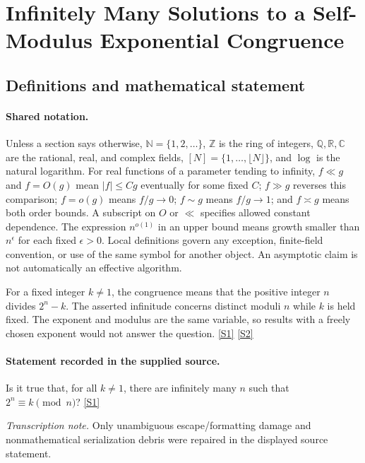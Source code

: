 \documentclass[11pt,a4paper]{article}
\newcommand{\N}{\mathbb{N}}
\newcommand{\Z}{\mathbb{Z}}
\newcommand{\Q}{\mathbb{Q}}
\newcommand{\R}{\mathbb{R}}
\newcommand{\C}{\mathbb{C}}
\newcommand{\sref}[2]{\hyperlink{source:#1:#2}{[S#2]}}
\begin{document}
\section{Infinitely Many Solutions to a Self-Modulus Exponential Congruence}\label{statement}


\subsection{Definitions and mathematical statement}

\paragraph{Shared notation.}Unless a section says otherwise, $\N=\{1,2,\ldots\}$,
$\Z$ is the ring of integers, $\Q,\R,\C$ are the rational, real, and complex
fields, $[N]=\{1,\ldots,\lfloor N\rfloor\}$, and $\log$ is the natural
logarithm. For real functions of a parameter tending to infinity,
$f\ll g$ and $f=O(g)$ mean $|f|\leq Cg$ eventually for some fixed $C$;
$f\gg g$ reverses this comparison; $f=o(g)$ means $f/g\to0$;
$f\sim g$ means $f/g\to1$; and $f\asymp g$ means both order bounds.
A subscript on $O$ or $\ll$ specifies allowed constant dependence.
The expression $n^{o(1)}$ in an upper bound means growth smaller than
$n^\epsilon$ for each fixed $\epsilon>0$. Local definitions govern any
exception, finite-field convention, or use of the same symbol for another
object. An asymptotic claim is not automatically an effective algorithm.



For a fixed integer $k\ne1$, the congruence means that the positive integer $n$ divides $2^n-k$. The asserted infinitude concerns distinct moduli $n$ while $k$ is held fixed. The exponent and modulus are the same variable, so results with a freely chosen exponent would not answer the question. \sref{statement}{1} \sref{statement}{2}

\paragraph{Statement recorded in the supplied source.}
Is it true that, for all $k\neq 1$, there are infinitely many $n$ such that $2^n\equiv k\pmod{n}$? \sref{statement}{1}

{\small\emph{Transcription note.} Only unambiguous escape/formatting damage and nonmathematical serialization debris were repaired in the displayed source statement.}
\end{document}
